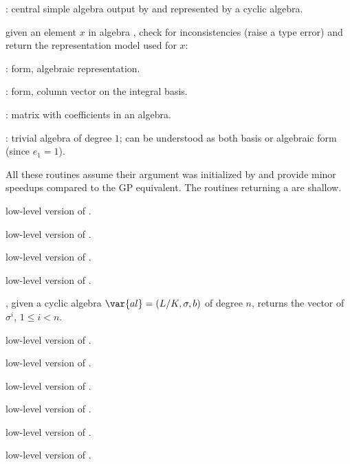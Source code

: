 \item {}: central  simple  algebra  output  by  and
represented by a cyclic algebra.

 given an element $x$ in algebra ,
check for inconsistencies (raise a type error) and return the representation
model used for $x$:

\item {}:  form, algebraic representation.

\item {}:  form, column vector on the integral
basis.

\item {}: matrix with coefficients in an algebra.

\item {}: trivial algebra of degree $1$; can be understood
as both basis or algebraic form (since $e_1 = 1$).


All these routines assume their argument was initialized by 
and provide minor speedups compared to the GP equivalent. The routines
returning a  are shallow.

 low-level version of .

 low-level version of .

 low-level version of .

 low-level version of .

, given a cyclic algebra $\var{al} =
(L/K,\sigma,b)$ of degree $n$, returns the vector of $\sigma^i$,
$1 \leq i < n$.

 low-level version of .

 low-level version of .

 low-level version of .

 low-level version of .

 low-level version of .

 low-level version of .

